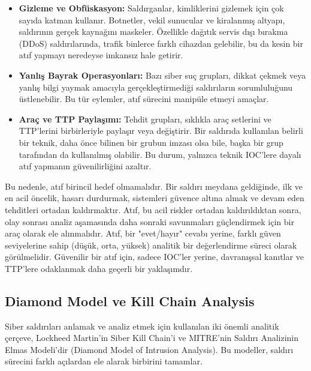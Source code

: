 \begin{itemize}
    \item \textbf{Gizleme ve Obfüskasyon:} Saldırganlar, kimliklerini gizlemek için çok sayıda katman kullanır. Botnetler, vekil sunucular ve kiralanmış altyapı, saldırının gerçek kaynağını maskeler. Özellikle dağıtık servis dışı bırakma (DDoS) saldırılarında, trafik binlerce farklı cihazdan gelebilir, bu da kesin bir atıf yapmayı neredeyse imkansız hale getirir.
    \item \textbf{Yanlış Bayrak Operasyonları:} Bazı siber suç grupları, dikkat çekmek veya yanlış bilgi yaymak amacıyla gerçekleştirmediği saldırıların sorumluluğunu üstlenebilir. Bu tür eylemler, atıf sürecini manipüle etmeyi amaçlar.
    \item \textbf{Araç ve TTP Paylaşımı:} Tehdit grupları, sıklıkla araç setlerini ve TTP'lerini birbirleriyle paylaşır veya değiştirir. Bir saldırıda kullanılan belirli bir teknik, daha önce bilinen bir grubun imzası olsa bile, başka bir grup tarafından da kullanılmış olabilir. Bu durum, yalnızca teknik IOC'lere dayalı atıf yapmanın güvenilirliğini azaltır.
\end{itemize}

Bu nedenle, atıf birincil hedef olmamalıdır. Bir saldırı meydana geldiğinde, ilk ve en acil öncelik, hasarı durdurmak, sistemleri güvence altına almak ve devam eden tehditleri ortadan kaldırmaktır. Atıf, bu acil riskler ortadan kaldırıldıktan sonra, olay sonrası analiz aşamasında daha sonraki savunmaları güçlendirmek için bir araç olarak ele alınmalıdır. Atıf, bir "evet/hayır" cevabı yerine, farklı güven seviyelerine sahip (düşük, orta, yüksek) analitik bir değerlendirme süreci olarak görülmelidir. Güvenilir bir atıf için, sadece IOC'ler yerine, davranışsal kanıtlar ve TTP'lere odaklanmak daha geçerli bir yaklaşımdır.

\subsection{Diamond Model ve Kill Chain Analysis}

Siber saldırıları anlamak ve analiz etmek için kullanılan iki önemli analitik çerçeve, Lockheed Martin'in Siber Kill Chain’i ve MITRE’nin Saldırı Analizinin Elmas Modeli’dir (Diamond Model of Intrusion Analysis). Bu modeller, saldırı sürecini farklı açılardan ele alarak birbirini tamamlar.

